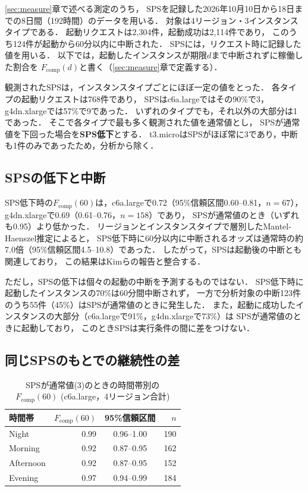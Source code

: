 \documentclass[submit,techrep,noauthor]{ipsj}
\newcommand{\Fcomp}{F_{\mathrm{comp}}}
\begin{document}
\ref{sec:measure}章で述べる測定のうち，
SPSを記録した2026年10月10日から18日までの8日間（192時間）のデータを用いる．
対象は4リージョン・3インスタンスタイプである．
起動リクエストは2,304件，起動成功は2,114件であり，
このうち124件が起動から60分以内に中断された．
SPSには，リクエスト時に記録した値を用いる．
以下では，起動したインスタンスが期限$d$まで中断されずに稼働した割合を
$\Fcomp(d)$と書く（\ref{sec:measure}章で定義する）．

観測されたSPSは，インスタンスタイプごとにほぼ一定の値をとった．
各タイプの起動リクエストは768件であり，
SPSはc6a.largeではその90\%で3，g4dn.xlargeでは57\%で9であった．
いずれのタイプでも，それ以外の大部分は1であった．
そこで各タイプで最も多く観測された値を通常値とし，
SPSが通常値を下回った場合を\textbf{SPS低下}とする．
t3.microはSPSがほぼ常に3であり，中断も1件のみであったため，分析から除く．

\subsection{SPSの低下と中断}

SPS低下時の$\Fcomp(60)$は，c6a.largeで0.72（95\%信頼区間0.60--0.81，$n=67$），
g4dn.xlargeで0.69（0.61--0.76，$n=158$）であり，
SPSが通常値のとき（いずれも0.95）より低かった．
リージョンとインスタンスタイプで層別したMantel-Haenszel推定によると，
SPS低下時に60分以内に中断されるオッズは通常時の約7.0倍（95\%信頼区間4.5--10.8）であった．
したがって，SPSは起動後の中断とも関連しており，
この結果はKimら\cite{Kim2024SpotInterruption}の報告と整合する．

ただし，SPSの低下は個々の起動の中断を予測するものではない．
SPS低下時に起動したインスタンスの70\%は60分間中断されず，
一方で分析対象の中断123件のうち55件（45\%）はSPSが通常値のときに発生した．
また，起動に成功したインスタンスの大部分（c6a.largeで91\%，g4dn.xlargeで73\%）は
SPSが通常値のときに起動しており，
このときSPSは実行条件の間に差をつけない．

\subsection{同じSPSのもとでの継続性の差}

\begin{table}[tb]
\caption{SPSが通常値(3)のときの時間帯別の$\Fcomp(60)$
(c6a.large，4リージョン合計)}
\label{tab:prelim}
\centering
\begin{tabular}{lrcr}\hline\hline
時間帯 & $\Fcomp(60)$ & 95\%信頼区間 & $n$\\\hline
Night     & 0.99 & 0.96--1.00 & 190\\
Morning   & 0.92 & 0.87--0.95 & 162\\
Afternoon & 0.92 & 0.87--0.95 & 152\\
Evening   & 0.97 & 0.94--0.99 & 184\\\hline
\end{tabular}
\end{table}
\end{document}
